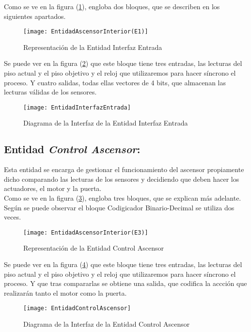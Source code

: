 	Como se ve en la figura (\ref{fig:EntidadesAscensorE1}), engloba dos bloques, que se describen en los siguientes apartados.
	\begin{figure}[H]
		    \centering
		    \texttt{[image: EntidadAscensorInterior(E1)]}
		    \caption{Representación de la Entidad Interfaz Entrada}
		    \label{fig:EntidadesAscensorE1}
	\end{figure}

	Se puede ver en la figura (\ref{fig:EntidadInterfazEntrada}) que este bloque tiene tres entradas, las lecturas del piso actual y el piso objetivo y el reloj que utilizaremos para hacer síncrono el proceso. Y cuatro salidas, todas ellas vectores de 4 bits, que almacenan las lecturas válidas de los sensores.
	\begin{figure}[H]
		    \centering
		    \texttt{[image: EntidadInterfazEntrada]}
		    \caption{Diagrama de la Interfaz de la Entidad Interfaz Entrada}
		    \label{fig:EntidadInterfazEntrada}
	\end{figure}

\subsection{Entidad \textit{Control Ascensor}:} \label{bloque:ControlAscensor}
	Esta entidad se encarga de gestionar el funcionamiento del ascensor propiamente dicho comparando las lecturas de los sensores y decidiendo que deben hacer los actuadores, el motor y la puerta.  \\ 

	Como se ve en la figura (\ref{fig:EntidadesAscensorE3}), engloba tres bloques, que se explican más adelante. Según se puede observar el bloque Codigicador Binario-Decimal se utiliza dos veces.
	\begin{figure}[H]
		    \centering
		    \texttt{[image: EntidadAscensorInterior(E3)]}
		    \caption{Representación de la Entidad Control Ascensor}
		    \label{fig:EntidadesAscensorE3}
	\end{figure}

	Se puede ver en la figura (\ref{fig:EntidadControlAscensor}) que este bloque tiene tres entradas, las lecturas del piso actual y el piso objetivo y el reloj que utilizaremos para hacer síncrono el proceso. Y que tras compararlas se obtiene una salida, que codifica la accción que realizarán tanto el motor como la puerta.
    \begin{figure}[H]
		    \centering
		    \texttt{[image: EntidadControlAscensor]}
		    \caption{Diagrama de la Interfaz de la Entidad Control Ascensor}
		    \label{fig:EntidadControlAscensor}
	\end{figure} 


